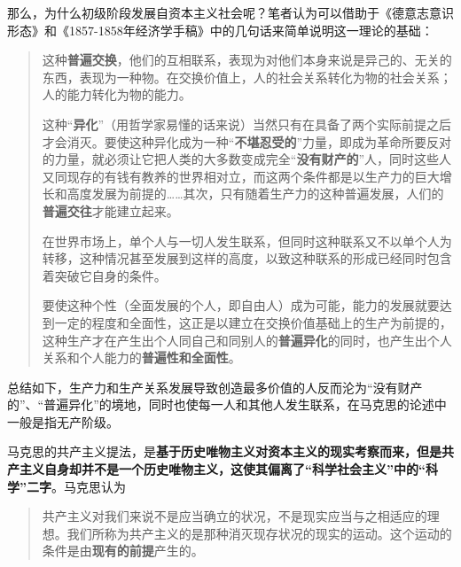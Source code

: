 那么，为什么初级阶段发展自资本主义社会呢？笔者认为可以借助于《德意志意识形态》和《1857-1858年经济学手稿》中的几句话来简单说明这一理论的基础：
\begin{quotation}这种\textbf{普遍交换}，他们的互相联系，表现为对他们本身来说是异己的、无关的东西，表现为一种物。在交换价值上，人的社会关系转化为物的社会关系；人的能力转化为物的能力。

  这种“\textbf{异化}”（用哲学家易懂的话来说）当然只有在具备了两个实际前提之后才会消灭。要使这种异化成为一种“\textbf{不堪忍受的}”力量，即成为革命所要反对的力量，就必须让它把人类的大多数变成完全“\textbf{没有财产的}”人，同时这些人又同现存的有钱有教养的世界相对立，而这两个条件都是以生产力的巨大增长和高度发展为前提的……其次，只有随着生产力的这种普遍发展，人们的\textbf{普遍交往}才能建立起来。

  在世界市场上，单个人与一切人发生联系，但同时这种联系又不以单个人为转移，这种情况甚至发展到这样的高度，以致这种联系的形成已经同时包含着突破它自身的条件。

  要使这种个性（全面发展的个人，即自由人）成为可能，能力的发展就要达到一定的程度和全面性，这正是以建立在交换价值基础上的生产为前提的， 这种生产才在产生出个人同自己和同别人的\textbf{普遍异化}的同时，也产生出个人关系和个人能力的\textbf{普遍性和全面性}。
\end{quotation}

总结如下，生产力和生产关系发展导致创造最多价值的人反而沦为“没有财产的”、“普遍异化”的境地，同时也使每一人和其他人发生联系，在马克思的论述中一般是指无产阶级。

马克思的共产主义提法，是\textbf{基于历史唯物主义对资本主义的现实考察而来，但是共产主义自身却并不是一个历史唯物主义，这使其偏离了“科学社会主义”中的“科学”二字}。马克思认为
\begin{quotation}共产主义对我们来说不是应当确立的状况，不是现实应当与之相适应的理想。我们所称为共产主义的是那种消灭现存状况的现实的运动。这个运动的条件是由\textbf{现有的前提}产生的。
\end{quotation}

